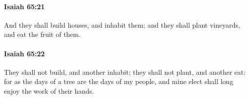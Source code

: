 		\paragraph{Isaiah 65:21} %
			\label{ISAIAH-65-21}

			And they shall build houses, and inhabit them; and they shall plant vineyards, and eat the fruit of them.


		\paragraph{Isaiah 65:22} %
			\label{ISAIAH-65-22}

			They shall not build, and another inhabit; they shall not plant, and another eat: for as the days of a tree are the days of my people, and mine elect shall long enjoy the work of their hands.


